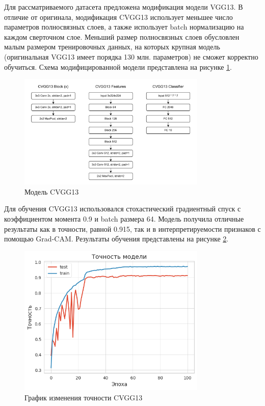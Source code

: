 Для рассматриваемого датасета предложена модификация модели VGG13.
В отличие от оригинала, модификация CVGG13 использует меньшее число параметров полносвязных слоев, а также использует batch нормализацию на каждом сверточном слое.
Меньший размер полносвязных слоев обусловлен малым размером тренировочных данных, на которых крупная модель (оригинальная VGG13 имеет порядка 130 млн. параметров) не сможет корректно обучиться.
Схема модифицированной модели представлена на рисунке \ref{fig:cvgg13}.
\begin{figure}[h]
    \centering
    \includegraphics[width=0.8\textwidth]{images/cvgg13_model.pdf}
    \caption{Модель CVGG13}
    \label{fig:cvgg13}
\end{figure}

Для обучения CVGG13 использовался стохастический градиентный спуск с коэффициентом момента 0.9 и batch размера 64.
Модель получила отличные результаты как в точности, равной 0.915, так и в интерпретируемости признаков с помощью Grad-CAM.
Результаты обучения представлены на рисунке \ref{fig:cvgg13_f1}.
\newpage
\begin{figure}[h]
    \centering
    \includegraphics[width=0.8\textwidth]{images/cvgg13_f1.png}
    \caption{График изменения точности CVGG13}
    \label{fig:cvgg13_f1}
\end{figure}

